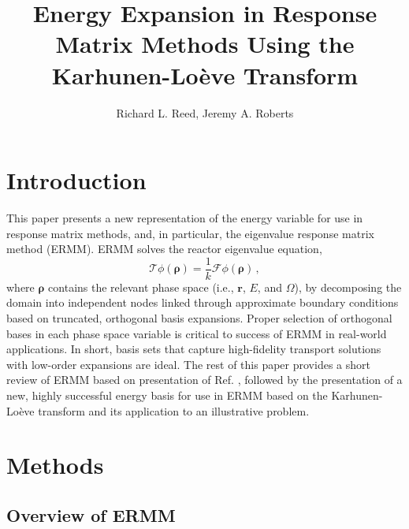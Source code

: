 \documentclass{anstrans}
\title{Energy Expansion in Response Matrix Methods Using the Karhunen-Lo\`{e}ve Transform}
\author{Richard L. Reed, Jeremy A. Roberts}
\institute{
Mechanical and Nuclear Engineering, Kansas State University, Manhattan, KS
}
\begin{document}
\section{Introduction}

This paper presents a new representation of the energy variable for use in
response matrix methods, and, in particular, the eigenvalue response matrix
method (ERMM).  ERMM solves the reactor eigenvalue equation,
\begin{equation}
  \mathcal{T} \phi(\bm{\rho}) =
    \frac{1}{k} \mathcal{F} \phi(\bm{\rho}) \, ,
  \label{eq:global}
\end{equation}
where $\bm{\rho}$ contains the relevant phase space (i.e., $\mathbf{r}$, $E$, and $\Omega$),
by decomposing the domain into independent nodes linked through approximate
boundary conditions based on truncated, orthogonal basis expansions.  Proper
selection of orthogonal bases in each phase space variable is critical to
success of ERMM in real-world applications.  In short, basis sets that capture
high-fidelity transport solutions with low-order expansions are ideal. The rest
of this paper provides a short review of ERMM based on presentation of Ref.
\cite{RobertsSerment}, followed by the presentation of a new, highly successful
energy basis for use in ERMM based on the Karhunen-Lo\`{e}ve transform and its
application to an illustrative problem.

\section{Methods}

\subsection{Overview of ERMM}
\end{document}
